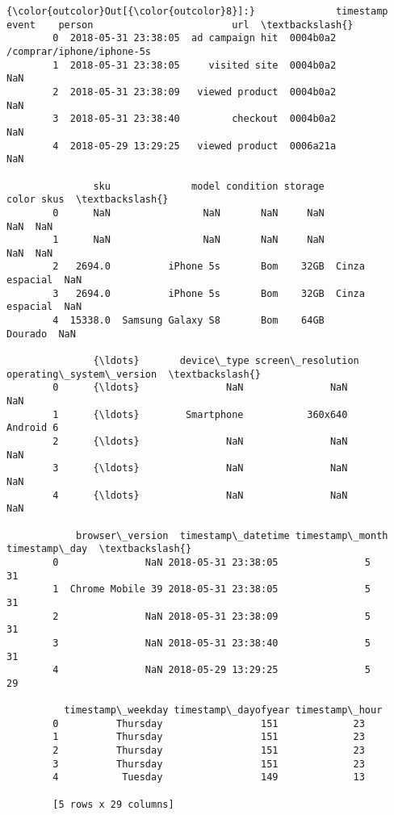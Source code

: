 \documentclass[11pt]{article}
\begin{document}
\begin{Verbatim}[commandchars=\\\{\}]
{\color{outcolor}Out[{\color{outcolor}8}]:}              timestamp            event    person                        url  \textbackslash{}
        0  2018-05-31 23:38:05  ad campaign hit  0004b0a2  /comprar/iphone/iphone-5s   
        1  2018-05-31 23:38:05     visited site  0004b0a2                        NaN   
        2  2018-05-31 23:38:09   viewed product  0004b0a2                        NaN   
        3  2018-05-31 23:38:40         checkout  0004b0a2                        NaN   
        4  2018-05-29 13:29:25   viewed product  0006a21a                        NaN   
        
               sku              model condition storage           color skus  \textbackslash{}
        0      NaN                NaN       NaN     NaN             NaN  NaN   
        1      NaN                NaN       NaN     NaN             NaN  NaN   
        2   2694.0          iPhone 5s       Bom    32GB  Cinza espacial  NaN   
        3   2694.0          iPhone 5s       Bom    32GB  Cinza espacial  NaN   
        4  15338.0  Samsung Galaxy S8       Bom    64GB         Dourado  NaN   
        
               {\ldots}       device\_type screen\_resolution operating\_system\_version  \textbackslash{}
        0      {\ldots}               NaN               NaN                      NaN   
        1      {\ldots}        Smartphone           360x640                Android 6   
        2      {\ldots}               NaN               NaN                      NaN   
        3      {\ldots}               NaN               NaN                      NaN   
        4      {\ldots}               NaN               NaN                      NaN   
        
            browser\_version  timestamp\_datetime timestamp\_month timestamp\_day  \textbackslash{}
        0               NaN 2018-05-31 23:38:05               5            31   
        1  Chrome Mobile 39 2018-05-31 23:38:05               5            31   
        2               NaN 2018-05-31 23:38:09               5            31   
        3               NaN 2018-05-31 23:38:40               5            31   
        4               NaN 2018-05-29 13:29:25               5            29   
        
          timestamp\_weekday timestamp\_dayofyear timestamp\_hour  
        0          Thursday                 151             23  
        1          Thursday                 151             23  
        2          Thursday                 151             23  
        3          Thursday                 151             23  
        4           Tuesday                 149             13  
        
        [5 rows x 29 columns]
\end{Verbatim}
            
\end{document}
